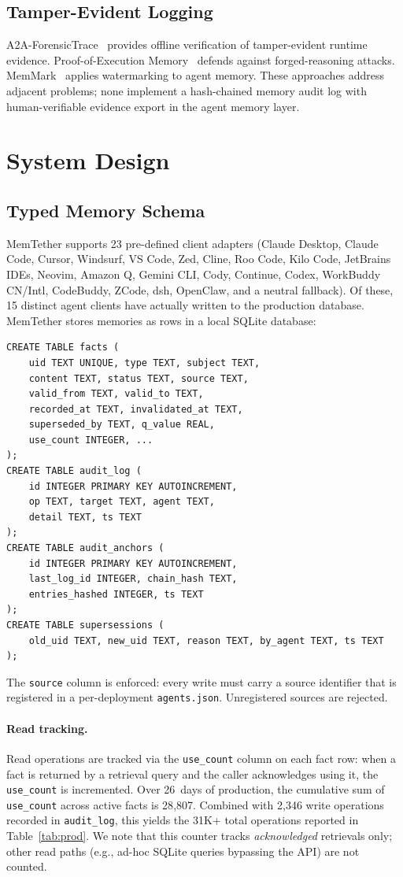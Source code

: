 ﻿\documentclass{article}
\begin{document}
\subsection{Tamper-Evident Logging}
A2A-ForensicTrace~\citep{a2a} provides offline verification of tamper-evident runtime evidence. Proof-of-Execution Memory~\citep{poem} defends against forged-reasoning attacks. MemMark~\citep{memmark} applies watermarking to agent memory. These approaches address adjacent problems; none implement a hash-chained memory audit log with human-verifiable evidence export in the agent memory layer.

\section{System Design}
\label{sec:design}

\subsection{Typed Memory Schema}
MemTether supports 23 pre-defined client adapters (Claude Desktop, Claude Code, Cursor, Windsurf, VS Code, Zed, Cline, Roo Code, Kilo Code, JetBrains IDEs, Neovim, Amazon Q, Gemini CLI, Cody, Continue, Codex, WorkBuddy CN/Intl, CodeBuddy, ZCode, dsh, OpenClaw, and a neutral fallback). Of these, 15 distinct agent clients have actually written to the production database. MemTether stores memories as rows in a local SQLite database:
\begin{verbatim}
CREATE TABLE facts (
    uid TEXT UNIQUE, type TEXT, subject TEXT,
    content TEXT, status TEXT, source TEXT,
    valid_from TEXT, valid_to TEXT,
    recorded_at TEXT, invalidated_at TEXT,
    superseded_by TEXT, q_value REAL,
    use_count INTEGER, ...
);
CREATE TABLE audit_log (
    id INTEGER PRIMARY KEY AUTOINCREMENT,
    op TEXT, target TEXT, agent TEXT,
    detail TEXT, ts TEXT
);
CREATE TABLE audit_anchors (
    id INTEGER PRIMARY KEY AUTOINCREMENT,
    last_log_id INTEGER, chain_hash TEXT,
    entries_hashed INTEGER, ts TEXT
);
CREATE TABLE supersessions (
    old_uid TEXT, new_uid TEXT, reason TEXT, by_agent TEXT, ts TEXT
);
\end{verbatim}

The \texttt{source} column is enforced: every write must carry a source identifier that is registered in a per-deployment \texttt{agents.json}. Unregistered sources are rejected.

\paragraph{Read tracking.}
Read operations are tracked via the \texttt{use\_count} column on each fact row: when a fact is returned by a retrieval query and the caller acknowledges using it, the \texttt{use\_count} is incremented. Over 26~days of production, the cumulative sum of \texttt{use\_count} across active facts is 28{,}807. Combined with 2{,}346 write operations recorded in \texttt{audit\_log}, this yields the 31K+ total operations reported in Table~\ref{tab:prod}. We note that this counter tracks \emph{acknowledged} retrievals only; other read paths (e.g., ad-hoc SQLite queries bypassing the API) are not counted.
\end{document}
